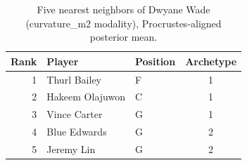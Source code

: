 \begin{table}[htbp]
  \centering\small
  \begin{tabular}{rllc}
    \toprule
    Rank & Player & Position & Archetype \\
    \midrule
    1 & Thurl Bailey & F & 1 \\
    2 & Hakeem Olajuwon & C & 1 \\
    3 & Vince Carter & G & 1 \\
    4 & Blue Edwards & G & 2 \\
    5 & Jeremy Lin & G & 2 \\
    \bottomrule
  \end{tabular}
  \caption{Five nearest neighbors of Dwyane Wade (curvature_m2 modality), Procrustes-aligned posterior mean.}
  \label{tab:Dwyane_Wade_neighbors_curvature_m2}
\end{table}

